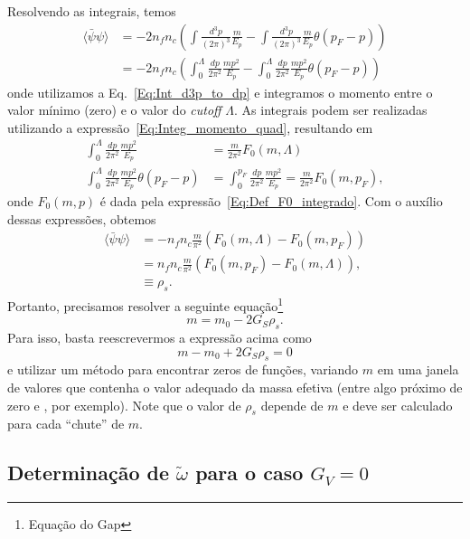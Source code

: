 Resolvendo as integrais, temos
\begin{align}
	\langle\bar{\psi}\psi\rangle &= - 2 n_f n_c \left(\int\frac{d^3p}{(2\pi)^3}\frac{m}{E_p} - \int\frac{d^3p}{(2\pi)^3} \frac{m}{E_p} \theta(p_F - p)\right) \\
	&= - 2 n_f n_c \left(\int_0^\Lambda\frac{dp}{2\pi^2} \frac{mp^2}{E_p} - \int_0^\Lambda \frac{dp}{2\pi^2} \frac{mp^2}{E_p} \theta(p_F - p)\right)
\end{align}
%
onde utilizamos a Eq.~\ref{Eq:Int_d3p_to_dp} e integramos o momento entre o valor mínimo (zero) e o valor do \emph{cutoff} $\Lambda$. As integrais podem ser realizadas utilizando a expressão~\eqref{Eq:Integ_momento_quad}, resultando em
\begin{align}
	\int_0^\Lambda \frac{dp}{2\pi^2} \frac{mp^2}{E_p} &= \frac{m}{2\pi^2} F_0(m,\Lambda)\\
	\int_0^\Lambda \frac{dp}{2\pi^2} \frac{mp^2}{E_p} \theta(p_F - p) &= \int_0^{p_F} \frac{dp}{2\pi^2} \frac{mp^2}{E_p} = \frac{m}{2\pi^2} F_0(m,p_F),
\end{align}
%
onde $F_0(m, p)$ é dada pela expressão~\eqref{Eq:Def_F0_integrado}. Com o auxílio dessas expressões, obtemos
\begin{align}
	\langle\bar{\psi}\psi\rangle &= - n_f n_c \frac{m}{\pi^2} (F_0(m,\Lambda) - F_0(m, p_F)) \label{Eq:Dens_Escalar_NJL_Gv_0}\\
	&= n_f n_c \frac{m}{\pi^2} (F_0(m,p_F) - F_0(m, \Lambda)), \\
	&\equiv \rho_s.
\end{align}
%
Portanto, precisamos resolver a seguinte equação\footnote{Equação do Gap}
\begin{equation}\label{Eq:Eq_Gap_NJL}
m = m_0 - 2 G_S\rho_s.
\end{equation}
%
Para isso, basta reescrevermos a expressão acima como
\begin{equation}
	m - m_0 + 2 G_S\rho_s = 0
\end{equation}
%
e utilizar um método para encontrar zeros de funções, variando $m$ em uma janela de valores que contenha o valor adequado da massa efetiva (entre algo próximo de zero e , por exemplo). Note que o valor de $\rho_s$ depende de $m$ e deve ser calculado para cada ``chute'' de $m$.

\subsection{Determinação de $\tilde{\omega}$ para o caso $G_V = 0$}

